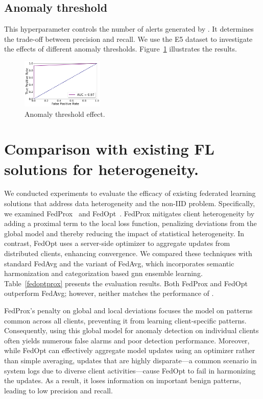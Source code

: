 \subsection{Anomaly threshold}
\label{app:threshold}

This hyperparameter controls the number of alerts generated by \Sys. It determines the trade-off between precision and recall. We use the E5 dataset to investigate the effects of different anomaly thresholds. Figure~\ref{thresh} illustrates the results. 

\begin{figure}[!h]
  \centering
  \includegraphics[width=0.35\textwidth]{fig/thresh.pdf}
  \caption{Anomaly threshold effect.}
  \label{thresh}
  \vspace{-2ex}
\end{figure}



\section{Comparison with existing FL solutions for heterogeneity.}
\label{sec:fedalternatives}

We conducted experiments to evaluate the efficacy of existing federated learning solutions that address data heterogeneity and the non-IID problem. Specifically, we examined FedProx~\cite{li2020federated} and FedOpt~\cite{asad2020fedopt}. FedProx mitigates client heterogeneity by adding a proximal term to the local loss function, penalizing deviations from the global model and thereby reducing the impact of statistical heterogeneity. In contrast, FedOpt uses a server-side optimizer to aggregate updates from distributed clients, enhancing convergence. We compared these techniques with standard FedAvg and the \Sys variant of FedAvg, which incorporates semantic harmonization and categorization based gnn ensemble learning. Table~\ref{fedoptprox} presents the evaluation results. Both FedProx and FedOpt outperform FedAvg; however, neither matches the performance of \Sys.

FedProx's penalty on global and local deviations focuses the model on patterns common across all clients, preventing it from learning client-specific patterns. Consequently, using this global model for anomaly detection on individual clients often yields numerous false alarms and poor detection performance. Moreover, while FedOpt can effectively aggregate model updates using an optimizer rather than simple averaging, updates that are highly disparate—a common scenario in system logs due to diverse client activities—cause FedOpt to fail in harmonizing the updates. As a result, it loses information on important benign patterns, leading to low precision and recall.

